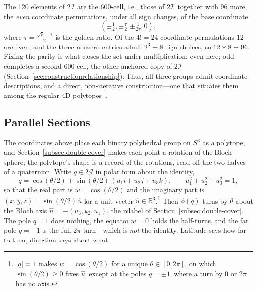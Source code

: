 \documentclass[11pt, oneside, openany]{scrbook}
\newcommand{\R}{\mathbb{R}}
\newcommand{\Tgroup}{\mathcal{T}}  %
\newcommand{\Igroup}{\mathcal{I}}  %
\newcommand{\Ggroup}{\mathcal{G}}
\newcommand{\TwoT}{2\Tgroup}
\newcommand{\TwoI}{2\Igroup}
\newcommand{\TwoG}{2\Ggroup}
\newcommand{\phig}{\tau} %
\DeclarePairedDelimiter{\abs}{\lvert}{\rvert}
\begin{document}
The 120 elements of $\TwoI$ are the 600-cell, i.e., those of $\TwoT$ together with 96 more, the \textit{even} coordinate permutations, under all sign changes, of the base coordinate
$$
\left(\pm \tfrac{1}{2}, \pm \tfrac{\phig}{2}, \pm \tfrac{1}{2\phig}, 0\right),
$$
where $\phig = \tfrac{\sqrt{5}+1}{2}$ is the golden ratio. Of the $4! = 24$ coordinate permutations $12$ are even, and the three nonzero entries admit $2^3 = 8$ sign choices, so $12 \times 8 = 96$. Fixing the parity is what closes the set under multiplication: even here; odd completes a second 600-cell, the other anchored copy of $\TwoI$ (Section~\ref{sec:constructionrelationship}). Thus, all three groups admit coordinate descriptions, and a direct, non-iterative construction---one that situates them among the regular 4D polytopes~\cite{coxeter1973regularpolytopes}.

\subsection{Parallel Sections} \label{app:rotations:sections}

The coordinates above place each binary polyhedral group on $S^3$ as a polytope, and Section~\ref{subsec:double-cover} makes each point a rotation of the Bloch sphere; the polytope's shape is a record of the rotations, read off the two halves of a quaternion. Write $q \in \TwoG$ in polar form about the identity,
$$
q = \cos(\theta/2) + \sin(\theta/2)\,(u_1 i + u_2 j + u_3 k), \qquad u_1^2 + u_2^2 + u_3^2 = 1,
$$
so that the real part is $w = \cos(\theta/2)$ and the imaginary part is $(x, y, z) = \sin(\theta/2)\,\hat u$ for a unit vector $\hat u \in \R^3$.\footnote{$\abs{q} = 1$ makes $w = \cos(\theta/2)$ for a unique $\theta \in [0, 2\pi]$, on which $\sin(\theta/2) \geq 0$ fixes $\hat u$, except at the poles $q = \pm 1$, where a turn by $0$ or $2\pi$ has no axis.} Then $\phi(q)$ turns by $\theta$ about the Bloch axis $\hat n = -(u_3, u_2, u_1)$, the relabel of Section~\ref{subsec:double-cover}. The pole $q = 1$ does nothing, the equator $w = 0$ holds the half-turns, and the far pole $q = -1$ is the full $2\pi$ turn---which is \textit{not} the identity. Latitude says how far to turn, direction says about what.
\end{document}
